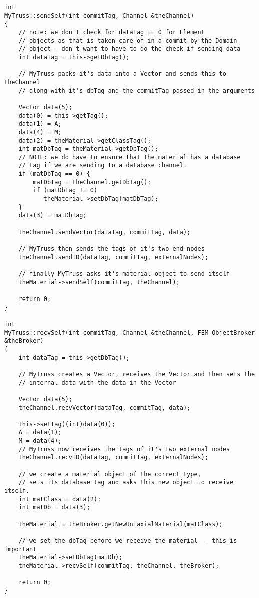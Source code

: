 \documentclass[12pt]{article}
\begin{document}
{\sf\small
\begin{verbatim}
int
MyTruss::sendSelf(int commitTag, Channel &theChannel)
{
    // note: we don't check for dataTag == 0 for Element
    // objects as that is taken care of in a commit by the Domain
    // object - don't want to have to do the check if sending data
    int dataTag = this->getDbTag();

    // MyTruss packs it's data into a Vector and sends this to theChannel
    // along with it's dbTag and the commitTag passed in the arguments

    Vector data(5);
    data(0) = this->getTag();
    data(1) = A;
    data(4) = M;
    data(2) = theMaterial->getClassTag();
    int matDbTag = theMaterial->getDbTag();
    // NOTE: we do have to ensure that the material has a database
    // tag if we are sending to a database channel.
    if (matDbTag == 0) {
        matDbTag = theChannel.getDbTag();
        if (matDbTag != 0)
           theMaterial->setDbTag(matDbTag);
    }
    data(3) = matDbTag;

    theChannel.sendVector(dataTag, commitTag, data);

    // MyTruss then sends the tags of it's two end nodes
    theChannel.sendID(dataTag, commitTag, externalNodes);

    // finally MyTruss asks it's material object to send itself
    theMaterial->sendSelf(commitTag, theChannel);

    return 0;
}

int
MyTruss::recvSelf(int commitTag, Channel &theChannel, FEM_ObjectBroker &theBroker)
{
    int dataTag = this->getDbTag();

    // MyTruss creates a Vector, receives the Vector and then sets the 
    // internal data with the data in the Vector

    Vector data(5);
    theChannel.recvVector(dataTag, commitTag, data);

    this->setTag((int)data(0));
    A = data(1);
    M = data(4);
    // MyTruss now receives the tags of it's two external nodes
    theChannel.recvID(dataTag, commitTag, externalNodes);

    // we create a material object of the correct type,
    // sets its database tag and asks this new object to receive itself.
    int matClass = data(2);
    int matDb = data(3);

    theMaterial = theBroker.getNewUniaxialMaterial(matClass);

    // we set the dbTag before we receive the material  - this is important
    theMaterial->setDbTag(matDb); 
    theMaterial->recvSelf(commitTag, theChannel, theBroker);

    return 0;
}
\end{verbatim} }
\end{document}

